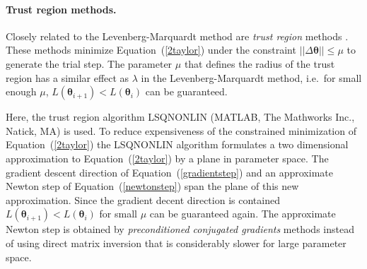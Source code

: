 \documentclass[12pt,a4paper]{scrartcl}
\begin{document}
\paragraph{Trust region methods.}
Closely related to the Levenberg-Marquardt method are \emph{trust region} methods \citep{Coleman:1996fk}. These methods minimize Equation~(\ref{2taylor}) under the constraint $\left|\left| \Delta \boldsymbol{\theta} \right|\right| \leq \mu $ to generate the trial step. The parameter $\mu$ that defines the radius of the trust region has a similar effect as $\lambda$ in the Levenberg-Marquardt method, i.e.~for small enough $\mu$, $L(\boldsymbol{\theta}_{i+1}) < L(\boldsymbol{\theta}_{i})$ can be guaranteed.

Here, the trust region algorithm LSQNONLIN (MATLAB, The Mathworks Inc., Natick, MA) is used. To reduce expensiveness of the constrained minimization of Equation~(\ref{2taylor}) the LSQNONLIN algorithm formulates a two dimensional approximation to Equation~(\ref{2taylor}) by a plane in parameter space. The gradient descent direction of Equation~(\ref{gradientstep}) and an approximate Newton step of Equation~(\ref{newtonstep}) span the plane of this new approximation. Since the gradient decent direction is contained $L(\boldsymbol{\theta}_{i+1}) < L(\boldsymbol{\theta}_{i})$ for small $\mu$ can be guaranteed again. The approximate Newton step is obtained by \emph{preconditioned conjugated gradients} methods \citep{Barrett:1994uq} instead of using direct matrix inversion that is considerably slower for large parameter space.
\end{document}
